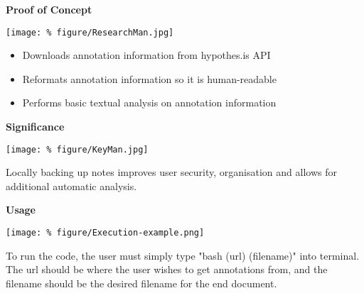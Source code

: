 \documentclass[unknownkeysallowed,usepdftitle=false, parskip=full]{beamer}
\newcommand{\secvariable}{nothing}
\newcommand{\mysection}[1]{\renewcommand{\secvariable}{#1}
}
\begin{document}
\mysection{line}
\begin{frame}\label{\secvariable}
\begin{center}
  \vspace{-0.5cm}
      \parbox{\linewidth}{\textbf{Proof of Concept}}
\texttt{[image: \%
  figure/ResearchMan.jpg]}

\end{center}
  \vspace{-0.2cm}
      \parbox{\linewidth}{
      
\begin{itemize}
\item  Downloads annotation information from hypothes.is API
\item Reformats annotation information so it is human-readable
\item Performs basic textual analysis on annotation information
\end{itemize}
  }
\end{frame}

\mysection{major}
\begin{frame}\label{\secvariable} %
\parbox{\linewidth}{\textbf{Significance}}
\begin{center}
\texttt{[image: \%
figure/KeyMan.jpg]}
\end{center}

    \parbox{\linewidth}{

Locally backing up notes improves user security, organisation and allows for additional automatic analysis.
}
\end{frame}

\mysection{slab}
\begin{frame}\label{\secvariable}
\begin{center}
 \parbox{\linewidth}{ \textbf{Usage}}
   \vspace{12pt}
   
\texttt{[image: \%
figure/Execution-example.png]}
\end{center}
    \parbox{\linewidth}{

To run the code, the user must simply type "bash (url) (filename)" into terminal. The url should be where the user wishes to get annotations from, and the filename should be the desired filename for the end document. \hyperlink{slabtable}{}
}

\end{frame}
\end{document}
